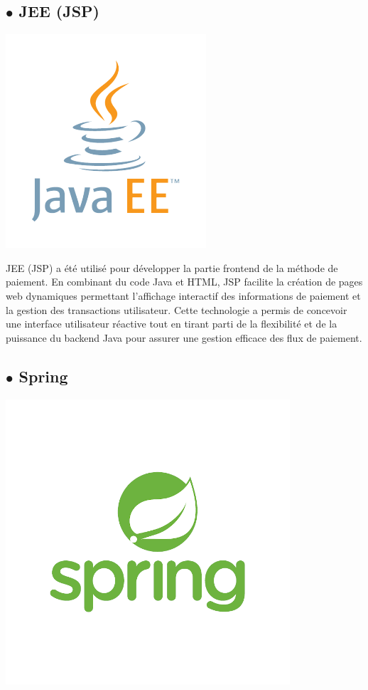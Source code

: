 \subsection*{$\bullet$ JEE (JSP)}
\begin{center}
    \centering
    \includegraphics[scale=0.5]{Figures/jee.png}
    \label{fig:processus}
\end{center} 

JEE (JSP) a été utilisé pour développer la partie frontend de la méthode de paiement. En combinant du code Java et HTML, JSP facilite la création de pages web dynamiques permettant l'affichage interactif des informations de paiement et la gestion des transactions utilisateur. Cette technologie a permis de concevoir une interface utilisateur réactive tout en tirant parti de la flexibilité et de la puissance du backend Java pour assurer une gestion efficace des flux de paiement.
\subsection*{$\bullet$ Spring}
\begin{center}
    \centering
    \includegraphics[scale=0.4]{Figures/spring.png}
    \label{fig:processus}
\end{center} 


